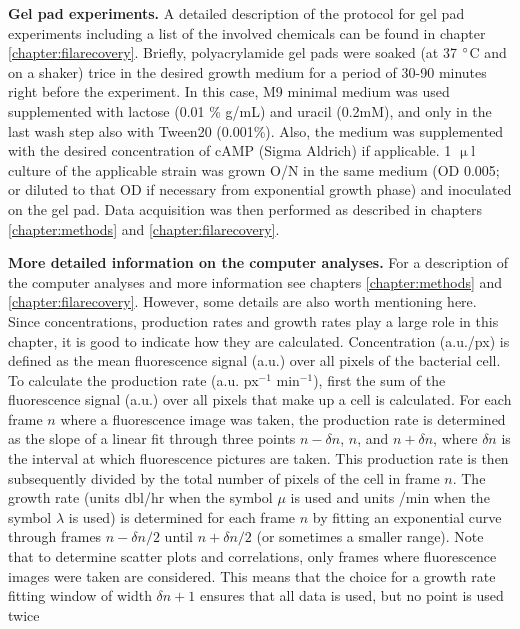 \textbf{Gel pad experiments.} A detailed description of the protocol for gel pad experiments including a list of the involved chemicals can be found in chapter \ref{chapter:filarecovery}. Briefly, polyacrylamide gel pads were soaked (at 37 $\degree$C and on a shaker) trice in the desired growth medium for a period of 30-90 minutes right before the experiment. In this case, M9 minimal medium was used supplemented with lactose (0.01 \% g/mL) and uracil (0.2mM), and only in the last wash step also with Tween20 (0.001\%).
Also, the medium was supplemented with the desired concentration of cAMP (Sigma Aldrich) if applicable.
1 $\upmu$l culture of the applicable strain was grown O/N in the same medium (OD 0.005; or diluted to that OD if necessary from exponential growth phase) and inoculated on the gel pad. Data acquisition was then performed as described in chapters \ref{chapter:methods} and \ref{chapter:filarecovery}.

\textbf{More detailed information on the computer analyses.} 
For a description of the computer analyses and more information see chapters \ref{chapter:methods} and \ref{chapter:filarecovery}.
However, some details are also worth mentioning here. 
Since concentrations, production rates and growth rates play a large role in this chapter, it is good to indicate how they are calculated.
Concentration (a.u./px) is defined as the mean fluorescence signal (a.u.) 
over all pixels of the bacterial cell. 
%
To calculate the production rate (a.u. px$^{-1}$ min$^{-1}$), first the sum of the fluorescence signal (a.u.) over all pixels that make up a cell is calculated. 
For each frame $n$ where a fluorescence image was taken, the production rate is determined as the slope of a linear fit through three points $n-\delta{n}$, $n$, and $n+\delta{n}$, where $\delta{n}$ is the interval at which fluorescence pictures are taken. This production rate is then subsequently divided by the total number of pixels of the cell in frame $n$.
The growth rate 
(units dbl/hr when the symbol $\mu$ is used and units /min when the symbol $\lambda$ is used) 
is determined for each frame $n$ by fitting an exponential curve through frames $n-\delta{n}/2$ until $n+\delta{n}/2$ (or sometimes a smaller range).
Note that to determine scatter plots and correlations, only frames where fluorescence images were taken are considered.
This means that the choice for a growth rate fitting window of width $\delta{n}+1$ ensures that all data is used, but no point is used twice

